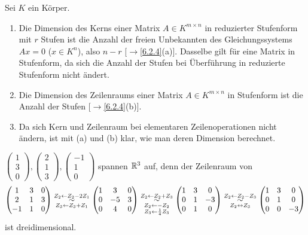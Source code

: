 \documentclass[../../main.tex]{subfiles}
\begin{document}
\begin{bem}\label{6.2.29} Sei $K$ ein Körper.
\begin{enumerate}[\normalfont(a)]
\item Die Dimension des Kerns einer Matrix $A\in K^{m\times n}$ in reduzierter Stufenform mit $r$ Stufen ist die Anzahl der freien Unbekannten des Gleichungssystems
$Ax=0$ ($x\in K^n$), also $n-r$ [$\to$\ref{6.2.4}(a)]. Dasselbe gilt für eine Matrix in Stufenform, da sich die Anzahl der Stufen bei Überführung in reduzierte Stufenform nicht ändert.
\item Die Dimension des Zeilenraums einer Matrix $A\in K^{m\times n}$ in Stufenform ist die Anzahl der Stufen [$\to$\ref{6.2.4}(b)].
\item Da sich Kern und Zeilenraum bei elementaren Zeilenoperationen nicht ändern, ist mit (a) und (b) klar, wie man deren Dimension berechnet.
\end{enumerate}
\end{bem}

\begin{bsp}\label{6.2.30}
$\left(\begin{smallmatrix}1\\3\\0\end{smallmatrix}\right),\left(\begin{smallmatrix}2\\1\\3\end{smallmatrix}\right),\left(\begin{smallmatrix}-1\\1\\0\end{smallmatrix}\right)$
spannen $\mathbb R^3$ auf, denn der Zeilenraum von
$$\begin{pmatrix}1&3&0\\2&1&3\\-1&1&0\end{pmatrix}
\underset{Z_3\leftarrow Z_3+Z_1}{\overset{Z_2\leftarrow Z_2-2Z_1}\sim}
\begin{pmatrix}1&3&0\\0&-5&3\\0&4&0\end{pmatrix}
\underset{\over{\scriptstyle Z_2\leftarrow-Z_2}{\scriptstyle Z_3\leftarrow\frac14Z_3}}{\overset{Z_2\leftarrow Z_2+Z_3}\sim}
\begin{pmatrix}1&3&0\\0&1&-3\\0&1&0\end{pmatrix}
\underset{Z_2\leftrightarrow Z_3}{\overset{Z_2\leftarrow Z_2-Z_3}\sim}
\begin{pmatrix}1&3&0\\0&1&0\\0&0&-3\end{pmatrix}$$
ist dreidimensional.
\end{bsp}
\end{document}
